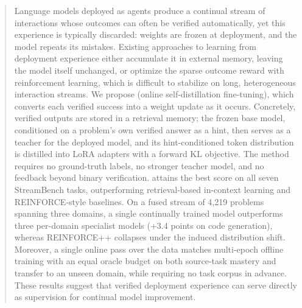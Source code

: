 \begin{abstract}
Language models deployed as agents produce a continual stream of interactions
whose outcomes can often be verified automatically, yet this experience is
typically discarded: weights are frozen at deployment, and the model repeats
its mistakes. Existing approaches to learning from deployment experience
either accumulate it in external memory, leaving the model itself unchanged,
or optimize the sparse outcome reward with reinforcement learning, which is
difficult to stabilize on long, heterogeneous interaction streams. We propose
\method{} (online self-distillation fine-tuning), which converts each verified
success into a weight update as it occurs. Concretely, verified outputs are
stored in a retrieval memory; the frozen base model, conditioned on a
problem's own verified answer as a hint, then serves as a teacher for the
deployed model, and its hint-conditioned token distribution is distilled into
LoRA adapters with a forward KL objective. The method requires no ground-truth
labels, no stronger teacher model, and no feedback beyond binary verification.
\method{} attains the best score on all seven StreamBench tasks, outperforming
retrieval-based in-context learning and REINFORCE-style baselines. On a fused
stream of 4{,}219 problems spanning three domains, a single continually
trained model outperforms three per-domain specialist models ($+3.4$ points on
code generation), whereas REINFORCE++ collapses under the induced distribution
shift. Moreover, a single online pass over the data matches multi-epoch offline
training with an equal oracle budget on both source-task mastery and transfer
to an unseen domain, while requiring no task corpus in advance. These results
suggest that verified deployment experience can serve directly as supervision
for continual model improvement.
\end{abstract}
